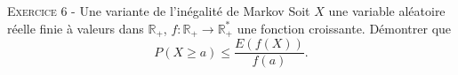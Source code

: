 \documentclass[11pt]{article}
\begin{document}


\vskip0.3cm\noindent\textsc{Exercice 6} - Une variante de l'inégalité de Markov
\vskip0.2cm
Soit $X$ une variable aléatoire réelle finie à valeurs dans $\mathbb R_+$, $f:\mathbb R_+\to\mathbb R_+^*$ une fonction croissante. Démontrer que
$$P(X\geq a)\leq \frac{E(f(X))}{f(a)}.$$




\vskip0.5cm

\end{document}
